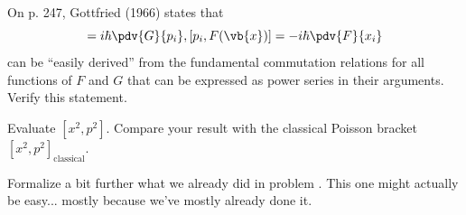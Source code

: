 \begin{question}

  \begin{questionpart}
    On p. 247, Gottfried (1966) states that
    \begin{equation*}
      [x_i, G(\vb{p})] = i\hbar \pdv{G}{p_i},
      [p_i,F(\vb{x})] = -i\hbar \pdv{F}{x_i}
    \end{equation*}
    can be ``easily derived'' from the fundamental commutation
    relations for all functions of $F$ and $G$ that can be expressed
    as power series in their arguments.  Verify this statement.
  \end{questionpart}

  \begin{questionpart}
    Evaluate $[x^2,p^2]$.  Compare your result with the classical
    Poisson bracket $[x^2,p^2]_{\text{classical}}$.
  \end{questionpart}
\end{question}

\begin{purpose}
  Formalize a bit further what we already did in problem
  .  This one might actually be easy... mostly
  because we've mostly already done it.
\end{purpose}

